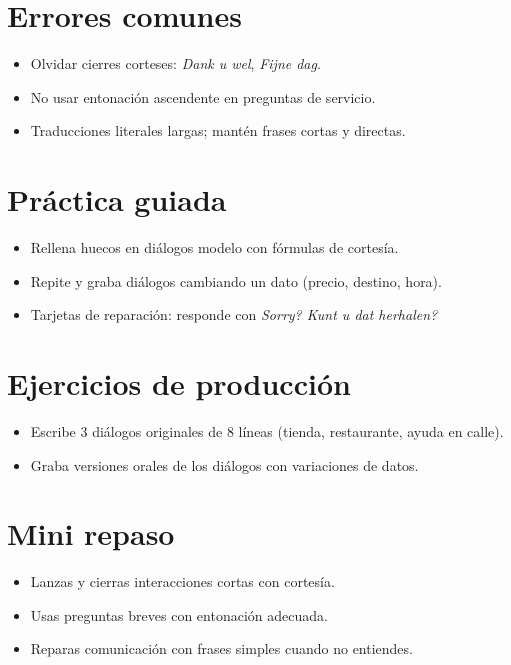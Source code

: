 \section{Errores comunes}
\begin{itemize}[leftmargin=*]
	\item Olvidar cierres corteses: \textit{Dank u wel}, \textit{Fijne dag}.
	\item No usar entonación ascendente en preguntas de servicio.
	\item Traducciones literales largas; mantén frases cortas y directas.
\end{itemize}

\section{Práctica guiada}
\begin{itemize}[leftmargin=*]
	\item Rellena huecos en diálogos modelo con fórmulas de cortesía.
	\item Repite y graba diálogos cambiando un dato (precio, destino, hora).
	\item Tarjetas de reparación: responde con \textit{Sorry? Kunt u dat herhalen?}
\end{itemize}

\section{Ejercicios de producción}
\begin{itemize}[leftmargin=*]
	\item Escribe 3 diálogos originales de 8 líneas (tienda, restaurante, ayuda en calle).
	\item Graba versiones orales de los diálogos con variaciones de datos.
\end{itemize}

\section{Mini repaso}
\begin{itemize}[leftmargin=*]
	\item Lanzas y cierras interacciones cortas con cortesía.
	\item Usas preguntas breves con entonación adecuada.
	\item Reparas comunicación con frases simples cuando no entiendes.
\end{itemize}

